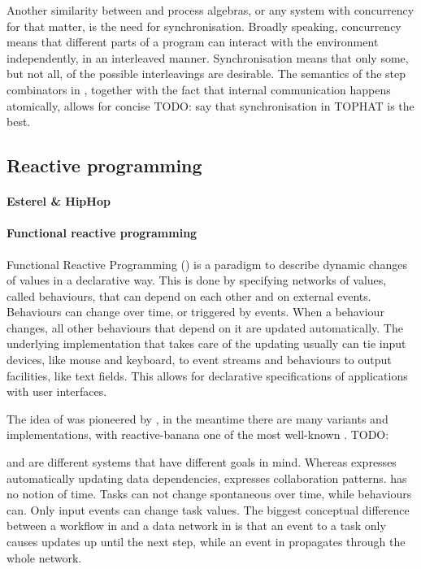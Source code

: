 Another similarity between \TOPHAT and process algebras, or any system with concurrency for that matter, is the need for synchronisation.
Broadly speaking, concurrency means that different parts of a program can interact with the environment independently, in an interleaved manner.
Synchronisation means that only some, but not all, of the possible interleavings are desirable.
The semantics of the step combinators in \TOPHAT, together with the fact that internal communication happens atomically, allows for concise TODO: say that synchronisation in TOPHAT is the best.


\subsection{Reactive programming}

\paragraph{Esterel \& HipHop}

\paragraph{Functional reactive programming}

Functional Reactive Programming (\FRP) is a paradigm to describe dynamic changes of values in a declarative way.
This is done by specifying networks of values, called behaviours, that can depend on each other and on external events.
Behaviours can change over time, or triggered by events.
When a behaviour changes, all other behaviours that depend on it are updated automatically.
The underlying implementation that takes care of the updating usually can tie input devices, like mouse and keyboard, to event streams and behaviours to output facilities, like text fields.
This allows for declarative specifications of applications with user interfaces.

The idea of \FRP was pioneered by \citet{conf/icfp/ElliottH97}, in the meantime there are many variants and implementations, with reactive-banana one of the most well-known \cite{reactive-banana}.
TODO: \cite{CooperK04} \cite{conf/oopsla/MeyerovichGBCGBK09}

\FRP and \TOP are different systems that have different goals in mind.
Whereas \FRP expresses automatically updating data dependencies, \TOP expresses collaboration patterns.
\TOP has no notion of time.
Tasks can not change spontaneous over time, while behaviours can.
Only input events can change task values.
The biggest conceptual difference between a workflow in \TOP and a data network in \FRP is that an event to a task only causes updates up until the next step, while an event in \FRP propagates through the whole network.

